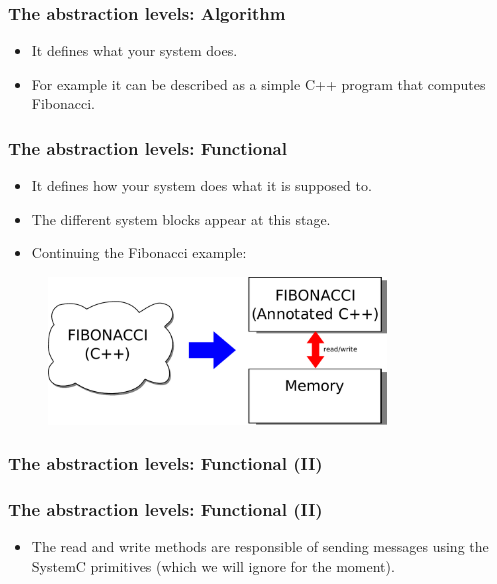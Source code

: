 {\begin{frame}
	\frametitle{The abstraction levels: Algorithm}
	\begin{itemize}
		\item<1-> It defines what your system does.
		\item<1-> For example it can be described as a simple C++ program that computes Fibonacci.
	\end{itemize}
	\begin{figure}[h]
		
	\end{figure}
\end{frame}

\begin{frame}
	\frametitle{The abstraction levels: Functional}
	\begin{itemize}
		\item<1-> It defines how your system does what it is supposed to.
		\item<1-> The different system blocks appear at this stage.
		\item<1-> Continuing the Fibonacci example:
	\end{itemize}
	\begin{figure}[h]
		\includegraphics[width=0.8\textwidth]{introduction/figures/fibonacci_algo_to_functional_level.pdf}
	\end{figure}
\end{frame}

\begin{frame}
	\frametitle{The abstraction levels: Functional (II)}
	\begin{figure}[h]
		
	\end{figure}
\end{frame}

\begin{frame}
	\frametitle{The abstraction levels: Functional (II)}
	\begin{itemize}
		\item<1-> The {\color{red}read} and {\color{red}write} methods are responsible of sending messages using the SystemC primitives (which we will ignore for the moment).
	\end{itemize}
	\begin{figure}[h]
		
	\end{figure}
\end{frame}

}
